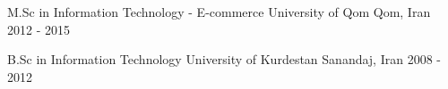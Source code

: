 

\begin{cventries}

  \cventry
    {M.Sc in Information Technology - E-commerce} %
    {University of Qom} %
    {Qom, Iran} %
    {2012 - 2015} %
    {
    }

  \cventry
    {B.Sc in Information Technology} %
    {University of Kurdestan} %
    {Sanandaj, Iran} %
    {2008 - 2012} %
    {
    }

\end{cventries}
